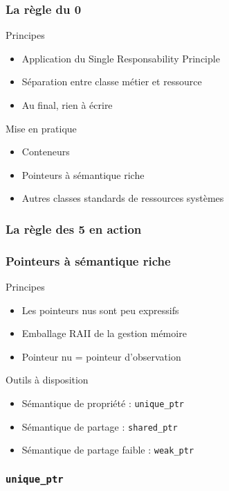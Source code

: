 \documentclass[svgnames]{beamer}
\begin{document}
\frame
{
  \frametitle{La règle du 0}
  \begin{block}{Principes}
  \begin{itemize}
  \item Application du Single Responsability Principle
  \item Séparation entre classe métier et ressource
  \item Au final, rien à écrire
  \end{itemize}
  \end{block}{}

  \begin{block}{Mise en pratique}
  \begin{itemize}
  \item Conteneurs
  \item Pointeurs à sémantique riche
  \item Autres classes standards de ressources systèmes
  \end{itemize}
  \end{block}{}
}

\frame
{
  \frametitle{La règle des 5 en action}
}

\frame
{
  \frametitle{Pointeurs à sémantique riche}
  \begin{block}{Principes}
  \begin{itemize}
  \item Les pointeurs nus sont peu expressifs
  \item Emballage RAII de la gestion mémoire
  \item Pointeur nu = pointeur d'observation
  \end{itemize}
  \end{block}{}

  \begin{block}{Outils à disposition}
  \begin{itemize}
  \item Sémantique de propriété : \texttt{unique\_ptr}
  \item Sémantique de partage : \texttt{shared\_ptr} 
  \item Sémantique de partage faible : \texttt{weak\_ptr}
  \end{itemize}
  \end{block}{}
}

\frame
{
  \frametitle{\texttt{unique\_ptr}}
}
\end{document}
